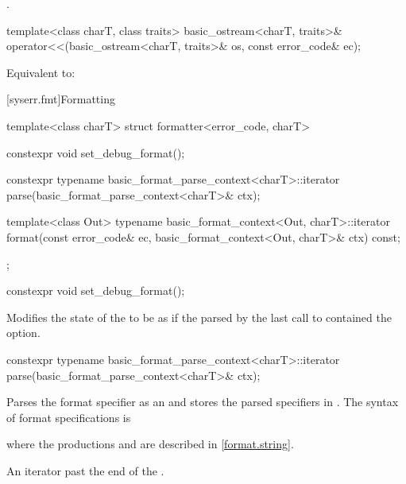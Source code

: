 \begin{itemdescr}
\pnum
\returns
{}.
\end{itemdescr}

%
\begin{itemdecl}
template<class charT, class traits>
  basic_ostream<charT, traits>& operator<<(basic_ostream<charT, traits>& os, const error_code& ec);
\end{itemdecl}

\begin{itemdescr}
\pnum
\effects
Equivalent to: 
\end{itemdescr}

[syserr.fmt]{Formatting}

\pnum
{}%
\begin{codeblock}
template<class charT>
struct formatter<error_code, charT> {
  constexpr void set_debug_format();

  constexpr typename basic_format_parse_context<charT>::iterator
    parse(basic_format_parse_context<charT>& ctx);

  template<class Out>
    typename basic_format_context<Out, charT>::iterator
      format(const error_code& ec, basic_format_context<Out, charT>& ctx) const;
};
\end{codeblock}

%
\begin{itemdecl}
constexpr void set_debug_format();
\end{itemdecl}

\begin{itemdescr}
\pnum
\effects
Modifies the state of the  to be as if the
 parsed by the
last call to  contained the  option.
\end{itemdescr}

%
\begin{itemdecl}
constexpr typename basic_format_parse_context<charT>::iterator
  parse(basic_format_parse_context<charT>& ctx);
\end{itemdecl}

\begin{itemdescr}
\pnum
\effects
Parses the format specifier as an 
and stores the parsed specifiers in .
The syntax of format specifications is
\begin{ncbnf}
\br
       
\end{ncbnf}
where the productions  and 
are described in \ref{format.string}.

\pnum
\returns
An iterator past the end of the .
\end{itemdescr}

